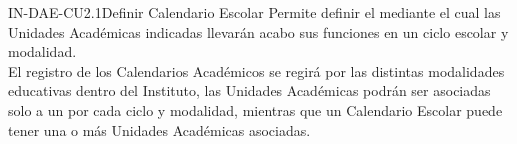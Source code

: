 \begin{UseCase}{IN-DAE-CU2.1}{Definir Calendario Escolar}{
	Permite definir el  mediante el cual las Unidades Académicas indicadas llevarán acabo sus funciones en un ciclo escolar y modalidad.\\
	
	El registro de los Calendarios Académicos se regirá por las distintas modalidades educativas dentro del Instituto, las Unidades Académicas podrán ser asociadas solo a un  por cada ciclo y modalidad, mientras que un Calendario Escolar puede tener una o más Unidades Académicas asociadas.
}


\end{UseCase}
